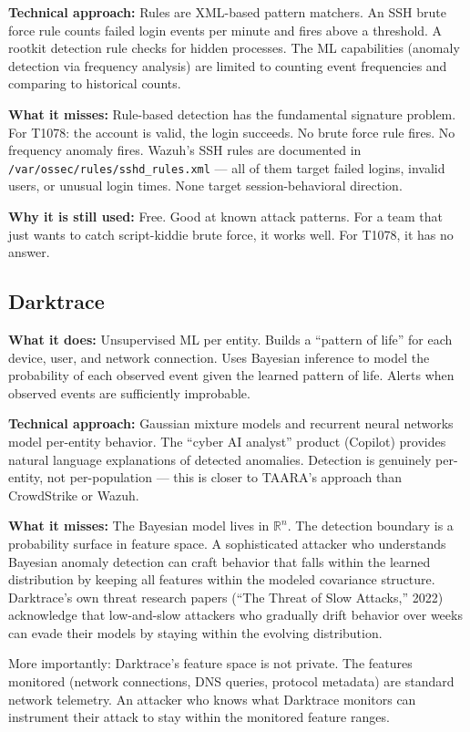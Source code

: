 \documentclass[11pt,a4paper]{article}
\begin{document}
\textbf{Technical approach:} Rules are XML-based pattern matchers. An SSH brute force rule counts failed login events per minute and fires above a threshold. A rootkit detection rule checks for hidden processes. The ML capabilities (anomaly detection via frequency analysis) are limited to counting event frequencies and comparing to historical counts.

\textbf{What it misses:} Rule-based detection has the fundamental signature problem. For T1078: the account is valid, the login succeeds. No brute force rule fires. No frequency anomaly fires. Wazuh's SSH rules are documented in \texttt{/var/ossec/rules/sshd\_rules.xml} — all of them target failed logins, invalid users, or unusual login times. None target session-behavioral direction.

\textbf{Why it is still used:} Free. Good at known attack patterns. For a team that just wants to catch script-kiddie brute force, it works well. For T1078, it has no answer.

\subsection{Darktrace}

\textbf{What it does:} Unsupervised ML per entity. Builds a ``pattern of life'' for each device, user, and network connection. Uses Bayesian inference to model the probability of each observed event given the learned pattern of life. Alerts when observed events are sufficiently improbable.

\textbf{Technical approach:} Gaussian mixture models and recurrent neural networks model per-entity behavior. The ``cyber AI analyst'' product (Copilot) provides natural language explanations of detected anomalies. Detection is genuinely per-entity, not per-population — this is closer to TAARA's approach than CrowdStrike or Wazuh.

\textbf{What it misses:} The Bayesian model lives in $\mathbb{R}^n$. The detection boundary is a probability surface in feature space. A sophisticated attacker who understands Bayesian anomaly detection can craft behavior that falls within the learned distribution by keeping all features within the modeled covariance structure. Darktrace's own threat research papers (``The Threat of Slow Attacks,'' 2022) acknowledge that low-and-slow attackers who gradually drift behavior over weeks can evade their models by staying within the evolving distribution.

More importantly: Darktrace's feature space is not private. The features monitored (network connections, DNS queries, protocol metadata) are standard network telemetry. An attacker who knows what Darktrace monitors can instrument their attack to stay within the monitored feature ranges.
\end{document}
